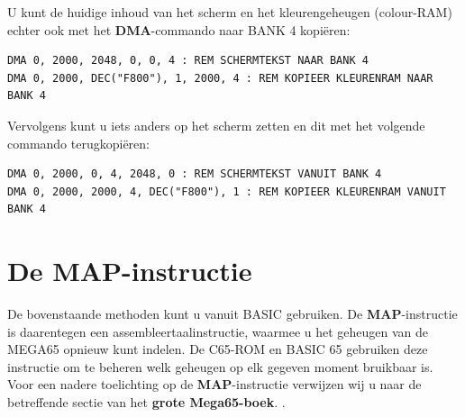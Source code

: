 U kunt de huidige inhoud van het scherm en het kleurengeheugen (colour-RAM) echter ook met het {\bf DMA}-commando naar BANK 4 kopiëren:
\begin{tcolorbox}[colback=black,coltext=white]
\verbatimfont{\codefont}
\begin{verbatim}
DMA 0, 2000, 2048, 0, 0, 4 : REM SCHERMTEKST NAAR BANK 4
DMA 0, 2000, DEC("F800"), 1, 2000, 4 : REM KOPIEER KLEURENRAM NAAR BANK 4
\end{verbatim}
\end{tcolorbox}

Vervolgens kunt u iets anders op het scherm zetten en dit met het volgende commando terugkopiëren:

\begin{tcolorbox}[colback=black,coltext=white]
\verbatimfont{\codefont}
\begin{verbatim}
DMA 0, 2000, 0, 4, 2048, 0 : REM SCHERMTEKST VANUIT BANK 4
DMA 0, 2000, 2000, 4, DEC("F800"), 1 : REM KOPIEER KLEURENRAM VANUIT BANK 4
\end{verbatim}
\end{tcolorbox}

\section{De MAP-instructie}

De bovenstaande methoden kunt u vanuit BASIC gebruiken. De {\bf MAP}-instructie is daarentegen een assembleertaalinstructie, waarmee u het geheugen van de MEGA65 opnieuw kunt indelen. De C65-ROM en BASIC 65 gebruiken deze instructie om te beheren welk geheugen op elk gegeven moment bruikbaar is. Voor een nadere toelichting op de {\bf MAP}-instructie verwijzen wij u naar de betreffende sectie van
\ifdefined\printmanual
 het {\bf grote Mega65-boek}.
\else
 .
\fi



